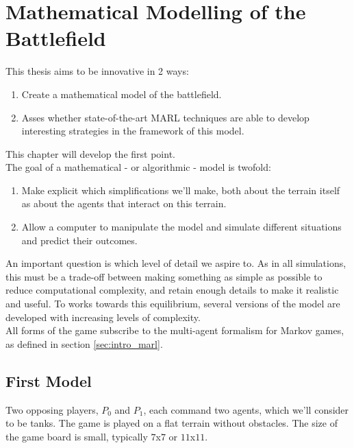 \chapter{Mathematical Modelling of the Battlefield}
\label{ch:modelling}
This thesis aims to be innovative in 2 ways:
\begin{enumerate}
    \item Create a mathematical model of the battlefield.
     \item Asses whether state-of-the-art MARL techniques are able to develop interesting strategies in the framework of this model.
\end{enumerate}
This chapter will develop the first point.\\
The goal of a mathematical - or algorithmic - model is twofold:
\begin{enumerate}
    \item Make explicit which simplifications we'll make, both about the terrain itself as about the agents that interact on this terrain.
    \item Allow a computer to manipulate the model and simulate different situations and predict their outcomes.
\end{enumerate}
An important question is which level of detail we aspire to. As in all simulations, this must be a trade-off between making something as simple as possible to reduce computational complexity, and retain enough details to make it realistic and useful. To works towards this equilibrium, several versions of the model are developed with increasing levels of complexity.\\
All forms of the game subscribe to the multi-agent formalism for Markov games, as defined in section \ref{sec:intro_marl}.

\section{First Model}
\label{sec:first_model}
Two opposing players, $P_0$ and $P_1$, each command two agents, which we'll consider to be tanks. The game is played on a flat terrain without obstacles. The  size of the game board is small, typically $7$x$7$ or $11$x$11$.\\

